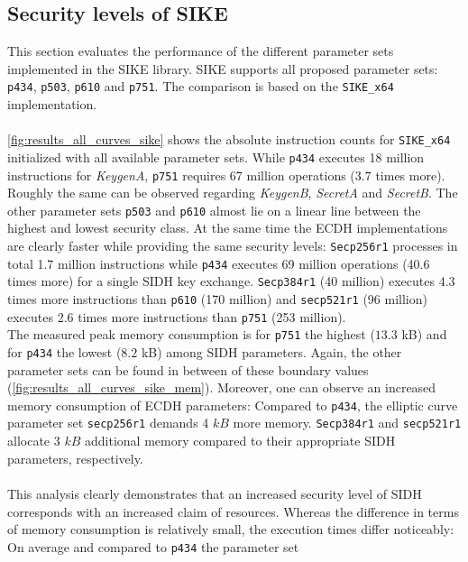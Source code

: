 \subsection{Security levels of SIKE}\label{sec:levels_sike}
This section evaluates the performance of the different parameter sets implemented in the \gls{SIKE} library.  \gls{SIKE} supports all proposed parameter sets: \texttt{p434}, \texttt{p503}, \texttt{p610} and \texttt{p751}. The comparison is based on the \texttt{SIKE\_x64} implementation.
\\\\
\autoref{fig:results_all_curves_sike} shows the absolute instruction counts for \texttt{SIKE\_x64} initialized with all available parameter sets. While \texttt{p434} executes 18 million instructions for \textit{KeygenA}, \texttt{p751} requires 67 million operations ($3.7$ times more). Roughly the same can be observed regarding \textit{KeygenB}, \textit{SecretA} and \textit{SecretB}. The other parameter sets \texttt{p503} and \texttt{p610} almost lie on a linear line between the highest and lowest security class. At the same time the \gls{ECDH} implementations are clearly faster while providing the same security levels: \texttt{Secp256r1} processes in total 1.7 million instructions while \texttt{p434} executes 69 million operations (40.6 times more) for a single \gls{SIDH} key exchange. \texttt{Secp384r1} (40 million) executes 4.3 times more instructions than \texttt{p610} (170 million) and \texttt{secp521r1} (96 million) executes 2.6 times more instructions than \texttt{p751} (253 million).\\
The measured peak memory consumption is for \texttt{p751} the highest ($13.3$ \gls{kB}) and for \texttt{p434} the lowest ($8.2$ \gls{kB}) among \gls{SIDH} parameters. Again, the other parameter sets can be found in between of these boundary values (\autoref{fig:results_all_curves_sike_mem}). Moreover, one can observe an increased memory consumption of \gls{ECDH} parameters: Compared to \texttt{p434}, the elliptic curve parameter set \texttt{secp256r1} demands 4 $kB$ more memory. \texttt{Secp384r1} and \texttt{secp521r1} allocate 3 $kB$ additional memory compared to their appropriate \gls{SIDH} parameters, respectively.\\\\
This analysis clearly demonstrates that an increased security level of \gls{SIDH} corresponds with an increased claim of resources. Whereas the difference in terms of memory consumption is relatively small, the execution times differ noticeably: On average and compared to \texttt{p434} the parameter set
